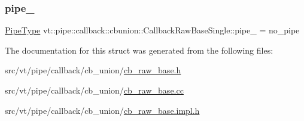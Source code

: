 \mbox{\label{structvt_1_1pipe_1_1callback_1_1cbunion_1_1_callback_raw_base_single_a7cff39d219279b2075d7db56e6b87944}} 
\subsubsection{\texorpdfstring{pipe\+\_\+}{pipe\_}}
{\footnotesize\ttfamily \hyperlink{namespacevt_ac9852acda74d1896f48f406cd72c7bd3}{Pipe\+Type} vt\+::pipe\+::callback\+::cbunion\+::\+Callback\+Raw\+Base\+Single\+::pipe\+\_\+ = no\+\_\+pipe\hspace{0.3cm}{\ttfamily [protected]}}



The documentation for this struct was generated from the following files\+:\begin{DoxyCompactItemize}
\item 
src/vt/pipe/callback/cb\+\_\+union/\hyperlink{cb__raw__base_8h}{cb\+\_\+raw\+\_\+base.\+h}\item 
src/vt/pipe/callback/cb\+\_\+union/\hyperlink{cb__raw__base_8cc}{cb\+\_\+raw\+\_\+base.\+cc}\item 
src/vt/pipe/callback/cb\+\_\+union/\hyperlink{cb__raw__base_8impl_8h}{cb\+\_\+raw\+\_\+base.\+impl.\+h}\end{DoxyCompactItemize}
